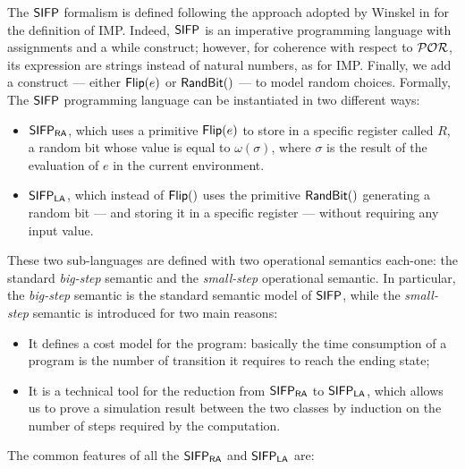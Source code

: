 The $\mathsf{SIFP}$ formalism is defined following the approach
adopted by Winskel in \cite{winskel1993formal} for the definition of IMP.
Indeed, $\mathsf{SIFP}$ is an imperative programming language with assignments
and a while construct; however, for coherence with respect to $\mathcal{POR}$,
its expression are strings instead of
natural numbers, as for IMP. Finally, we add a construct --- either $\mathsf{Flip(}e\mathsf{)}$ or
$\mathsf{RandBit()}$ --- to model random choices.
%
%
Formally, The $\mathsf{SIFP}$ programming language can be instantiated in two different ways:
\begin{itemize}
  \item $\mathsf{SIFP_{{\mathsf{RA}}}}$, which uses a primitive $\mathsf{Flip(}e\mathsf{)}$ to store in a specific register called $R$, a random bit whose value is equal to $\omega(\sigma)$, where $\sigma$ is the result of the evaluation of $e$ in the current environment.
  \item $\mathsf{SIFP_{{\mathsf{LA}}}}$, which instead of $\mathsf{Flip(}\mathsf{)}$ uses the primitive $\mathsf{RandBit()}$ generating
  a random bit ---  and storing it in a specific register ---
  without requiring any input value.
\end{itemize}
These two sub-languages are defined with two operational semantics each-one:
the standard \emph{big-step} semantic and the \emph{small-step} operational semantic.
%
In particular, the \emph{big-step} semantic is the standard semantic model of
$\mathsf{SIFP}$, while the \emph{small-step} semantic is introduced for two main reasons:
\begin{itemize}
  \item It defines a cost model for the program: basically the time
  consumption of a program is the number of transition it requires
  to reach the ending state;
  \item It is a technical tool for the reduction from $\mathsf{SIFP_{{\mathsf{RA}}}}$ to $\mathsf{SIFP_{{\mathsf{LA}}}}$,
  which allows us to prove a simulation result between the two classes by induction on the number of steps required by the
  computation.
\end{itemize}
%
%
The common features of all the $\mathsf{SIFP_{{\mathsf{RA}}}}$ and $\mathsf{SIFP_{{\mathsf{LA}}}}$ are:
